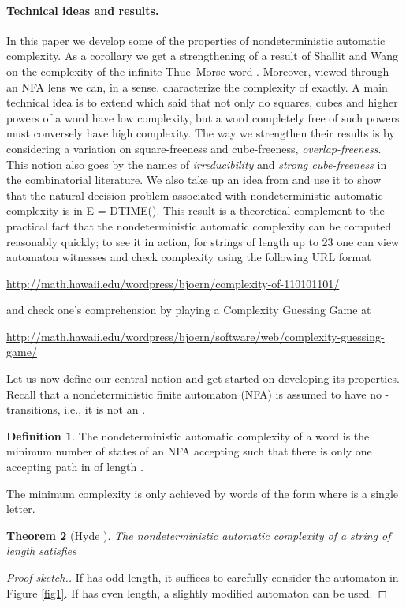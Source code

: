 \documentclass[12pt]{article}
\newcommand{\myUrl}[1]{
	\begin{center}
		{\small\url{#1}} 
	\end{center}
}
\theoremstyle{plain}
\newtheorem{thm}{Theorem}
\theoremstyle{definition}
\newtheorem{df}[thm]{Definition}
\theoremstyle{remark}
\begin{document}
		\paragraph{Technical ideas and results.} In this paper we develop some of the properties of nondeterministic automatic complexity.
		As a corollary we get a strengthening of a result of Shallit and Wang \cite{MR1897300}
		on the complexity of the infinite Thue--Morse word .
		Moreover, viewed through an NFA lens we can, in a sense, characterize the complexity of  exactly.
		A main technical idea is to extend \cite[Theorem 9]{MR1897300} which said that
		not only do squares, cubes and higher powers of a word have low complexity,
		but a word completely free of such powers must conversely have high complexity.
		The way we strengthen their results is by considering a variation
		on square-freeness and cube-freeness, \emph{overlap-freeness}.
		This notion also goes by the names of \emph{irreducibility} and \emph{strong cube-freeness} in the combinatorial literature.
		We also take up an idea from \cite[Theorem 8]{MR1897300} and use it to show that
		the natural decision problem associated with nondeterministic automatic complexity is in E = DTIME().
		This result is a theoretical complement to the practical fact that
		the nondeterministic automatic complexity can be computed reasonably quickly;
		to see it in action, for strings of length up to 23
		one can view automaton witnesses and check complexity using the following URL format
			\myUrl{http://math.hawaii.edu/wordpress/bjoern/complexity-of-110101101/}
		and check one's comprehension by playing a Complexity Guessing Game at
			\myUrl{http://math.hawaii.edu/wordpress/bjoern/software/web/complexity-guessing-game/}
		Let us now define our central notion and get started on developing its properties.
		Recall that a nondeterministic finite automaton (NFA) is assumed to have no -transitions, i.e.,
		it is not an .
		\begin{df}\label{precise}
			The nondeterministic automatic complexity  of a word  is the minimum number of states of an NFA  accepting 
			such that there is only one accepting path in  of length .
		\end{df}
		The minimum complexity  is only achieved by words of the form  where  is a single letter.
		\begin{thm}[Hyde \cite{Hyde}]\label{Hyde}
			The nondeterministic automatic complexity  of a string  of length  satisfies
			
		\end{thm}
		\begin{proof}[Proof sketch.]
			If  has odd length, it suffices to carefully consider the automaton in Figure \ref{fig1}.
			If  has even length, a slightly modified automaton can be used.
		\end{proof}
\end{document}
